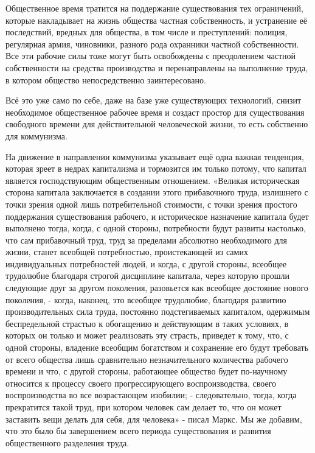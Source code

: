 \documentclass[12pt,a4paper,openany]{book}
\begin{document}
Общественное время тратится на поддержание существования тех ограничений, которые накладывает на жизнь общества частная собственность, и устранение её последствий, вредных для общества, в том числе и преступлений: полиция, регулярная армия, чиновники, разного рода охранники частной собственности. Все эти рабочие силы тоже могут быть освобождены с преодолением частной собственности на средства производства и перенаправлены на выполнение труда, в котором общество непосредственно заинтересовано.

Всё это уже само по себе, даже на базе уже существующих технологий, снизит необходимое общественное рабочее время и создаст простор для существования свободного времени для действительной человеческой жизни, то есть собственно для коммунизма.

На движение в направлении коммунизма указывает ещё одна важная тенденция, которая зреет в недрах капитализма и тормозится им только потому, что капитал является господствующим общественным отношением. «Великая историческая сторона капитала заключается в создании этого прибавочного труда, излишнего с точки зрения одной лишь потребительной стоимости, с точки зрения простого поддержания существования рабочего, и историческое назначение капитала будет выполнено тогда, когда, с одной стороны, потребности будут развиты настолько, что сам прибавочный труд, труд за пределами абсолютно необходимого для жизни, станет всеобщей потребностью, проистекающей из самих индивидуальных потребностей людей, и когда, с другой стороны, всеобщее трудолюбие благодаря строгой дисциплине капитала, через которую прошли следующие друг за другом поколения, разовьется как всеобщее достояние нового поколения, - когда, наконец, это всеобщее трудолюбие, благодаря развитию производительных сила труда, постоянно подстегиваемых капиталом, одержимым беспредельной страстью к обогащению и действующим в таких условиях, в которых он только и может реализовать эту страсть, приведет к тому, что, с одной стороны, владение всеобщим богатством и сохранение его будут требовать от всего общества лишь сравнительно незначительного количества рабочего времени и что, с другой стороны, работающее общество будет по-научному относится к процессу своего прогрессирующего воспроизводства, своего воспроизводства во все возрастающем изобилии; - следовательно, тогда, когда прекратится такой труд, при котором человек сам делает то, что он может заставить вещи делать для себя, для человека» - писал Маркс. Мы же добавим, что это было бы завершением всего периода существования и развития общественного разделения труда.
\end{document}
